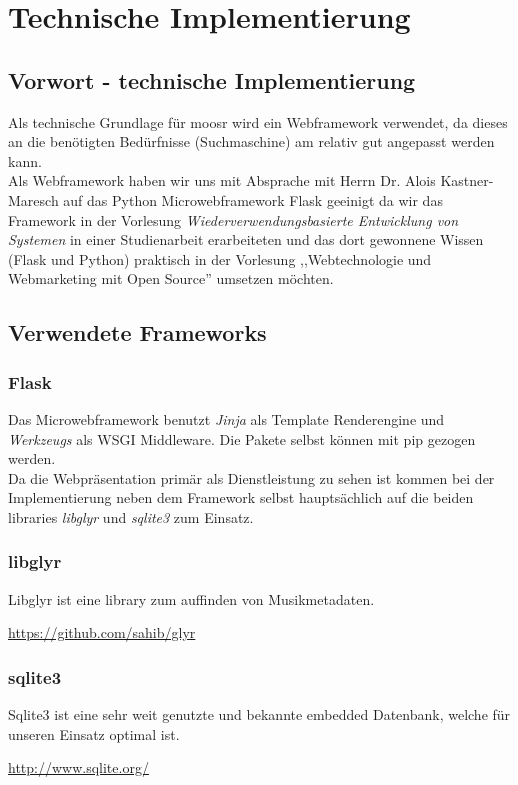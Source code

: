 \chapter{Technische Implementierung}

\section{Vorwort - technische Implementierung}
Als technische Grundlage für moosr wird ein Webframework verwendet, da dieses an
die benötigten Bedürfnisse (Suchmaschine) am relativ gut angepasst werden kann.
\\
Als Webframework haben wir uns mit Absprache mit Herrn Dr. Alois
Kastner-Maresch auf das Python Microwebframework Flask geeinigt da wir das
Framework in der Vorlesung \emph{Wiederverwendungsbasierte Entwicklung von
Systemen} in einer Studienarbeit erarbeiteten und das dort gewonnene Wissen (Flask
und Python) praktisch in der Vorlesung ,,Webtechnologie und Webmarketing 
mit Open Source'' umsetzen möchten.

\section{Verwendete Frameworks}

\subsection{Flask}
Das Microwebframework benutzt \emph{Jinja} als Template Renderengine und
\emph{Werkzeugs} als WSGI Middleware. Die Pakete selbst können mit pip gezogen
werden.
\\
Da die Webpräsentation primär als Dienstleistung zu sehen ist kommen bei der
Implementierung neben dem Framework selbst hauptsächlich auf die beiden
libraries \emph{libglyr} und \emph{sqlite3} zum Einsatz.

\subsection{libglyr}
Libglyr ist eine library zum auffinden von Musikmetadaten. 
\\
\begin{center}
\url{https://github.com/sahib/glyr}
\end{center}

\subsection{sqlite3}
Sqlite3 ist eine sehr weit genutzte und bekannte embedded Datenbank, welche für
unseren Einsatz optimal ist.
\\
\begin{center}
\url{http://www.sqlite.org/}
\end{center}



